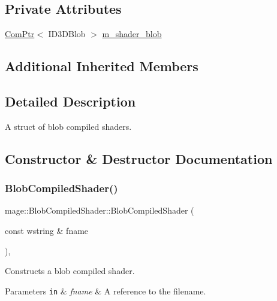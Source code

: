 \subsection*{Private Attributes}
\begin{DoxyCompactItemize}
\item 
\hyperlink{namespacemage_ae74f374780900893caa5555d1031fd79}{Com\+Ptr}$<$ I\+D3\+D\+Blob $>$ \hyperlink{classmage_1_1_blob_compiled_shader_a1a6959678592e3456ac8cb810dbdf648}{m\+\_\+shader\+\_\+blob}
\end{DoxyCompactItemize}
\subsection*{Additional Inherited Members}


\subsection{Detailed Description}
A struct of blob compiled shaders. 

\subsection{Constructor \& Destructor Documentation}
\hypertarget{classmage_1_1_blob_compiled_shader_adc5b712c668912296a634bffb3a31e68}{}\label{classmage_1_1_blob_compiled_shader_adc5b712c668912296a634bffb3a31e68} 
\subsubsection{\texorpdfstring{Blob\+Compiled\+Shader()}{BlobCompiledShader()}\hspace{0.1cm}{\footnotesize\ttfamily [1/3]}}
{\footnotesize\ttfamily mage\+::\+Blob\+Compiled\+Shader\+::\+Blob\+Compiled\+Shader (\begin{DoxyParamCaption}\item[{const wstring \&}]{fname }\end{DoxyParamCaption})\hspace{0.3cm}{\ttfamily [explicit]}, {\ttfamily [noexcept]}}

Constructs a blob compiled shader.


\begin{DoxyParams}[1]{Parameters}
\mbox{\tt in}  & {\em fname} & A reference to the filename. \\
\hline
\end{DoxyParams}

